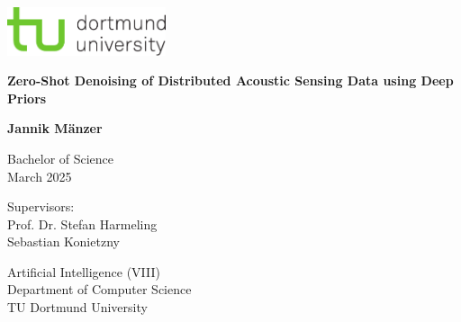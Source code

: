 \begin{titlepage}
    \begin{center}
        \begin{minipage}[t]{\textwidth}
            \raggedleft
            \includegraphics[width=0.35\textwidth]{img/tud-logo.pdf}
        \end{minipage}
    
        \vspace{3cm}
            
        \Huge
        \textbf{Zero-Shot Denoising of Distributed Acoustic Sensing Data using Deep Priors}
            
        \vspace{1.5cm}
            
        \LARGE
        \textbf{Jannik Mänzer}
            
        \vspace{1.5cm}
          
        \Large
        Bachelor of Science\\
        March 2025
    \end{center}

    \vfill

    \noindent
    \begin{minipage}[t]{0.5\textwidth}
        \raggedright
        \Large
        Supervisors:\\
        Prof. Dr. Stefan Harmeling\\
        Sebastian Konietzny\\
    \end{minipage}
    \hfill
    \begin{minipage}[t]{0.5\textwidth}
        \raggedleft
        \Large
        Artificial Intelligence (VIII)\\
        Department of Computer Science\\
        TU Dortmund University\\
    \end{minipage}
\end{titlepage}
